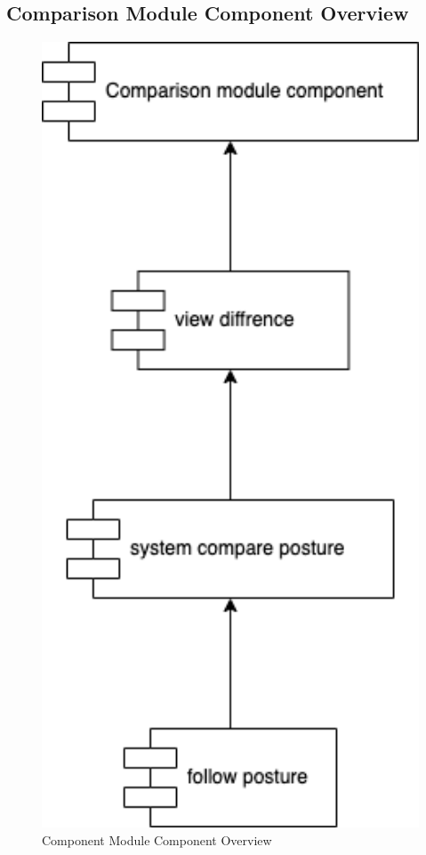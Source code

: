 \documentclass[16pt]{scrreprt}
\begin{document}
\subsection{Comparison Module Component Overview}
\begin{figure}[H]
    \centering
    \includegraphics[width=1\textwidth]{diagrams/comparison.png}
    \caption{Component Module Component Overview}
\end{figure}
\end{document}
